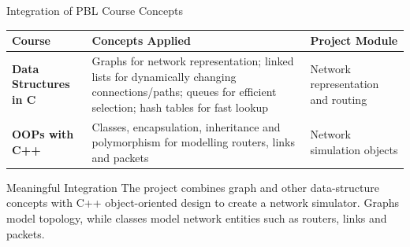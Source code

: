 \documentclass[aspectratio=169,11pt]{beamer}
\begin{document}
\begin{frame}{Integration of PBL Course Concepts}

\scriptsize

\begin{center}
\renewcommand{\arraystretch}{1.25}

\begin{tabularx}{.96\textwidth}{@{}>{\bfseries}p{3.0cm}X p{3.0cm}@{}}
\toprule
Course & Concepts Applied & Project Module\\
\midrule

Data Structures in C &
Graphs for network representation; linked lists for dynamically changing
connections/paths; queues for efficient selection; hash tables for fast lookup &
Network representation and routing \\

OOPs with C++ &
Classes, encapsulation, inheritance and polymorphism for modelling routers,
links and packets &
Network simulation objects \\

\bottomrule
\end{tabularx}

\end{center}

\vspace{4mm}

\begin{block}{Meaningful Integration}
The project combines graph and other data-structure concepts with C++ object-oriented
design to create a network simulator. Graphs model topology, while classes model
network entities such as routers, links and packets.
\end{block}

\vfill

\begin{center}
\end{center}

\end{frame}
\end{document}
